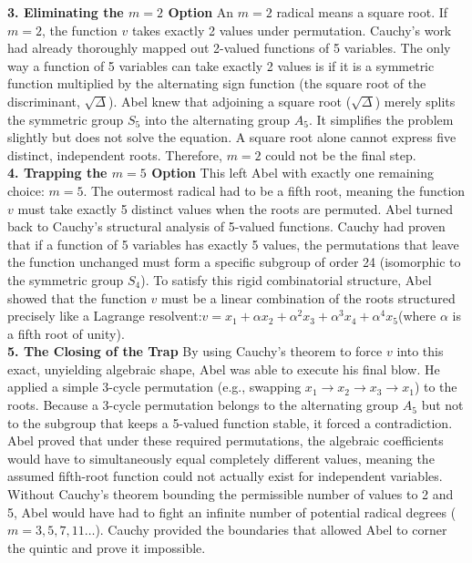 {\bf 3. Eliminating the \(m = 2\) Option}
An \(m=2\) radical means a square root. 
If \(m=2\), the function \(v\) takes exactly 2 values under permutation.
Cauchy's work had already thoroughly mapped out 2-valued functions of 5 variables. 
The only way a function of 5 variables can take exactly 2 values is if it is a symmetric function multiplied by the alternating sign function 
(the square root of the discriminant, \(\sqrt{\Delta }\)).
Abel knew that adjoining a square root (\(\sqrt{\Delta }\)) merely splits the symmetric group \(S_{5}\) into the alternating group \(A_{5}\). 
It simplifies the problem slightly but does not solve the equation. 
A square root alone cannot express five distinct, independent roots. 
Therefore, \(m=2\) could not be the final step.\\

{\bf 4. Trapping the \(m = 5\) Option}
This left Abel with exactly one remaining choice: \(m = 5\). 
The outermost radical had to be a fifth root, meaning the function \(v\) must take exactly 5 distinct values when the roots are permuted.
Abel turned back to Cauchy's structural analysis of 5-valued functions. 
Cauchy had proven that if a function of 5 variables has exactly 5 values, the permutations that leave the function unchanged must form a specific subgroup of order 24 
(isomorphic to the symmetric group \(S_{4}\)).
To satisfy this rigid combinatorial structure, Abel showed that the function \(v\) must be a linear combination of the roots structured precisely like a 
Lagrange resolvent:\(v=x_{1}+\alpha x_{2}+\alpha ^{2}x_{3}+\alpha ^{3}x_{4}+\alpha ^{4}x_{5}\)(where \(\alpha \) is a fifth root of unity).\\

{\bf 5. The Closing of the Trap}
By using Cauchy's theorem to force \(v\) into this exact, unyielding algebraic shape, Abel was able to execute his final blow.
He applied a simple 3-cycle permutation (e.g., swapping \(x_1 \to x_2 \to x_3 \to x_1\)) to the roots. 
Because a 3-cycle permutation belongs to the alternating group \(A_{5}\) but not to the subgroup that keeps a 5-valued function stable, it forced a contradiction. 
Abel proved that under these required permutations, the algebraic coefficients would have to simultaneously equal completely different values, 
meaning the assumed fifth-root function could not actually exist for independent variables.
Without Cauchy's theorem bounding the permissible number of values to 2 and 5, Abel would have had to fight an infinite number of potential radical degrees (\(m=3, 5, 7, 11\dots\)). 
Cauchy provided the boundaries that allowed Abel to corner the quintic and prove it impossible.\\

